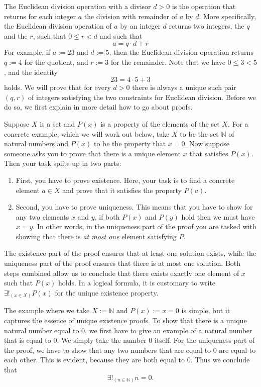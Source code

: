 The Euclidean division operation with a divisor $d>0$ is the operation that returns for each integer $a$ the division with remainder of $a$ by $d$. More specifically, the Euclidean division operation of $a$ by an integer $d$ returns two integers, the  $q$ and the  $r$, such that $0\leq r <d$ and such that
\begin{equation*}
  a= q\cdot d + r
\end{equation*}
For example, if $a:=23$ and $d:=5$, then the Euclidean division operation returns $q:=4$ for the quotient, and $r:=3$ for the remainder. Note that we have $0\leq 3<5$, and the identity
\begin{equation*}
  23=4\cdot 5+3
\end{equation*}
holds. We will prove that for every $d>0$ there is always a unique such pair $(q,r)$ of integers satisfying the two constraints for Euclidean division. Before we do so, we first explain in more detail how to go about  proofs.

Suppose $X$ is a set and $P(x)$ is a property of the elements of the set $X$. For a concrete example, which we will work out below, take $X$ to be the set $\mathbb{N}$ of natural numbers and $P(x)$ to be the property that $x=0$. Now suppose someone asks you to prove that there is a unique element $x$ that satisfies $P(x)$. Then your task splits up in two parts:
\begin{enumerate}
\item First, you have to prove existence. Here, your task is to find a concrete element $a\in X$ and prove that it satisfies the property $P(a)$.
\item Second, you have to prove uniqueness. This means that you have to show for any two elements $x$ and $y$, if both $P(x)$ and $P(y)$ hold then we must have $x=y$. In other words, in the uniqueness part of the proof you are tasked with showing that there is \emph{at most one} element satisfying $P$.
\end{enumerate}
The existence part of the proof ensures that at least one solution exists, while the uniqueness part of the proof ensures that there is at most one solution. Both steps combined allow us to conclude that there exists exactly one element of $x$ such that $P(x)$ holds. In a logical formula, it is customary to write $\exists!_{(x\in X)}P(x)$ for the unique existence property.

The example where we take $X:=\mathbb{N}$ and $P(x):=x=0$ is simple, but it captures the essence of unique existence proofs. To show that there is a unique natural number equal to $0$, we first have to give an example of a natural number that is equal to $0$. We simply take the number $0$ itself. For the uniqueness part of the proof, we have to show that any two numbers that are equal to $0$ are equal to each other. This is evident, because they are both equal to $0$. Thus we conclude that
\begin{equation*}
  \exists!_{(n\in\mathbb{N})}n=0.
\end{equation*}

